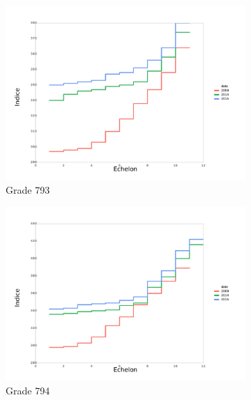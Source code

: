 \documentclass[11pt,a4paper]{article}
\begin{document}
\medskip


\begin{figure}[ht] 
  \caption{Evolution des grilles: grade par grade}
  \label{echelon_by_neg} 
  \begin{subfigure}[b]{0.55\linewidth}
      \caption{Grade 793} 
    \label{echelon_by_neg_0} 
    \centering
    \includegraphics[width=1\linewidth]{AT_793_grille_by_neg.pdf} 
  \end{subfigure}%
  \begin{subfigure}[b]{0.55\linewidth}
        \caption{Grade 794} 
    \label{echelon_by_neg_1} 
    \centering
    \includegraphics[width=1\linewidth]{AT_794_grille_by_neg.pdf} 
  \end{subfigure} 
  \begin{subfigure}[b]{0.55\linewidth}

\end{subfigure}
\end{figure}
\end{document}
